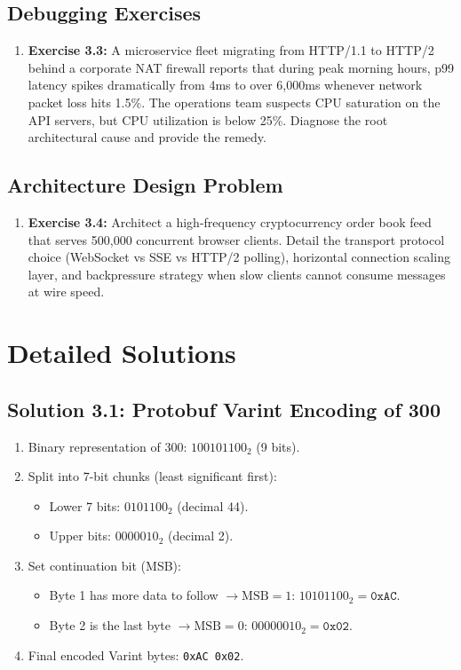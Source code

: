 \subsection{Debugging Exercises}
\begin{enumerate}
  \item \textbf{Exercise 3.3:} A microservice fleet migrating from HTTP/1.1 to HTTP/2 behind a corporate NAT firewall reports that during peak morning hours, p99 latency spikes dramatically from 4ms to over 6,000ms whenever network packet loss hits 1.5\%. The operations team suspects CPU saturation on the API servers, but CPU utilization is below 25\%. Diagnose the root architectural cause and provide the remedy.
\end{enumerate}

\subsection{Architecture Design Problem}
\begin{enumerate}
  \item \textbf{Exercise 3.4:} Architect a high-frequency cryptocurrency order book feed that serves 500,000 concurrent browser clients. Detail the transport protocol choice (WebSocket vs SSE vs HTTP/2 polling), horizontal connection scaling layer, and backpressure strategy when slow clients cannot consume messages at wire speed.
\end{enumerate}

\section{Detailed Solutions}

\subsection{Solution 3.1: Protobuf Varint Encoding of 300}
\begin{enumerate}[leftmargin=15pt]
  \item Binary representation of $300$: $100101100_2$ (9 bits).
  \item Split into 7-bit chunks (least significant first):
  \begin{itemize}
    \item Lower 7 bits: $0101100_2$ (decimal 44).
    \item Upper bits: $0000010_2$ (decimal 2).
  \end{itemize}
  \item Set continuation bit (MSB):
  \begin{itemize}
    \item Byte 1 has more data to follow $\rightarrow \text{MSB} = 1$: $10101100_2 = \texttt{0xAC}$.
    \item Byte 2 is the last byte $\rightarrow \text{MSB} = 0$: $00000010_2 = \texttt{0x02}$.
  \end{itemize}
  \item Final encoded Varint bytes: \texttt{0xAC 0x02}.
\end{enumerate}

